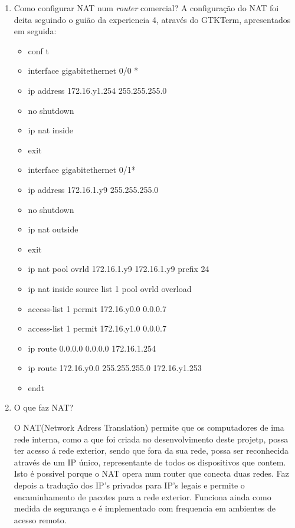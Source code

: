 \documentclass{article}
\begin{document}
\begin{enumerate}
\item Como configurar NAT num \textit{router} comercial?
A configuração do NAT foi deita seguindo o guião da experiencia 4, através do GTKTerm, apresentados em seguida:
\begin{itemize}
    \item  conf t
    \item  interface gigabitethernet 0/0 *
    \item  ip address 172.16.y1.254 255.255.255.0
    \item  no shutdown
    \item  ip nat inside
    \item  exit
    \item  interface gigabitethernet 0/1*
    \item  ip address 172.16.1.y9 255.255.255.0
    \item  no shutdown
    \item  ip nat outside
    \item  exit
    \item  ip nat pool ovrld 172.16.1.y9 172.16.1.y9 prefix 24
    \item  ip nat inside source list 1 pool ovrld overload
    \item  access-list 1 permit 172.16.y0.0 0.0.0.7
    \item  access-list 1 permit 172.16.y1.0 0.0.0.7
    \item  ip route 0.0.0.0 0.0.0.0 172.16.1.254
    \item  ip route 172.16.y0.0 255.255.255.0 172.16.y1.253
    \item  endt
\end{itemize}


\item O que faz NAT?

O NAT(Network Adress Translation) permite que os computadores de ima rede interna, como a que foi criada no desenvolvimento deste projetp, possa ter acesso á rede exterior, sendo que fora da sua rede, possa ser reconhecida através de um IP único, representante de todos os dispositivos que contem.
Isto é possivel porque o NAT opera num router que conecta duas redes. Faz depois a tradução dos IP's privados para IP's legais e permite o encaminhamento de pacotes para a rede exterior.
Funciona ainda como medida de segurança e é implementado com frequencia em ambientes de acesso remoto.

\end{enumerate}
\end{document}
